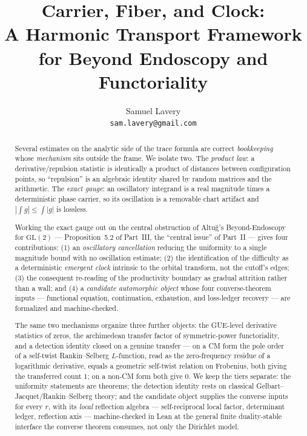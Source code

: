 \documentclass[11pt]{article}
\title{Carrier, Fiber, and Clock:\\
A Harmonic Transport Framework for Beyond Endoscopy and Functoriality}
\author{Samuel Lavery\\ \texttt{sam.lavery@gmail.com}}
\date{}
\theoremstyle{definition}
\begin{document}
\maketitle

\begin{abstract}
Several estimates on the analytic side of the trace formula are correct \emph{bookkeeping} whose
\emph{mechanism} sits outside the frame. We isolate two. The \emph{product law}: a
derivative/repulsion statistic is identically a product of distances between configuration points, so
``repulsion'' is an algebraic identity shared by random matrices and the arithmetic. The \emph{exact
gauge}: an oscillatory integrand is a real magnitude times a deterministic phase carrier, so its
oscillation is a removable chart artifact and $|\int g|\le\int|g|$ is lossless.

Working the exact gauge out on the central obstruction of Altu\u{g}'s Beyond-Endoscopy for
$\mathrm{GL}(2)$ --- Proposition~5.2 of Part~III, the ``central issue'' of Part~II --- gives four
contributions: (1) an \emph{oscillatory cancellation} reducing the uniformity to a single magnitude
bound with no oscillation estimate; (2) the identification of the difficulty as a deterministic
\emph{emergent clock} intrinsic to the orbital transform, not the cutoff's edges; (3) the consequent
re-reading of the productivity boundary as gradual attrition rather than a wall; and (4) a
\emph{candidate automorphic object} whose four converse-theorem inputs --- functional equation,
continuation, exhaustion, and loss-ledger recovery --- are formalized and machine-checked.

The same two mechanisms organize three further objects: the GUE-level derivative statistics of zeros,
the archimedean transfer factor of symmetric-power functoriality, and a detection identity closed on a
genuine transfer --- on a CM form the pole order of a self-twist Rankin--Selberg $L$-function, read as
the zero-frequency residue of a logarithmic derivative, equals a geometric self-twist relation on
Frobenius, both giving the transferred count $1$; on a non-CM form both give $0$. We keep the tiers
separate: the uniformity statements are theorems; the detection identity rests on classical
Gelbart--Jacquet/Rankin--Selberg theory; and the candidate object supplies the converse inputs for
every $r$, with its \emph{local} reflection algebra --- self-reciprocal local factor, determinant
ledger, reflection axis --- machine-checked in Lean at the general finite duality-stable interface the
converse theorem consumes, not only the Dirichlet model.


\end{abstract}
\end{document}
